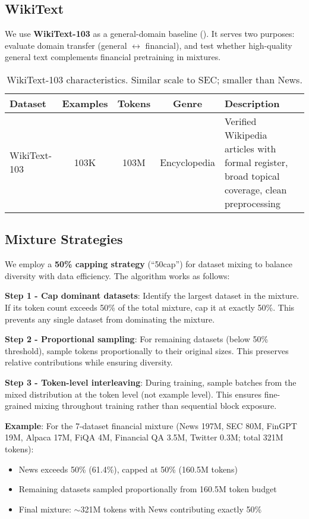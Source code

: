\subsection{WikiText}

We use \textbf{WikiText-103} \parencite{merity2016pointer} as a general-domain baseline (). It serves two purposes: evaluate domain transfer (general $\leftrightarrow$ financial), and test whether high-quality general text complements financial pretraining in mixtures.

\begin{table}[h]
\centering
\caption[WikiText Dataset Characteristics]{WikiText-103 characteristics. Similar scale to SEC; smaller than News.}
\label{tab:wikitext_dataset}
\small
\begin{tabular}{p{3cm}cccp{5.5cm}}
\toprule
\textbf{Dataset} & \textbf{Examples} & \textbf{Tokens} & \textbf{Genre} & \textbf{Description} \\
\midrule
WikiText-103 & 103K & 103M & Encyclopedia & Verified Wikipedia articles with formal register, broad topical coverage, clean preprocessing \\
\bottomrule
\end{tabular}
\end{table}

\subsection{Mixture Strategies}

We employ a \textbf{50\% capping strategy} (``50cap'') for dataset mixing to balance diversity with data efficiency. The algorithm works as follows:

\textbf{Step 1 - Cap dominant datasets}: Identify the largest dataset in the mixture. If its token count exceeds 50\% of the total mixture, cap it at exactly 50\%. This prevents any single dataset from dominating the mixture.

\textbf{Step 2 - Proportional sampling}: For remaining datasets (below 50\% threshold), sample tokens proportionally to their original sizes. This preserves relative contributions while ensuring diversity.

\textbf{Step 3 - Token-level interleaving}: During training, sample batches from the mixed distribution at the token level (not example level). This ensures fine-grained mixing throughout training rather than sequential block exposure.

\textbf{Example}: For the 7-dataset financial mixture (News 197M, SEC 80M, FinGPT 19M, Alpaca 17M, FiQA 4M, Financial QA 3.5M, Twitter 0.3M; total 321M tokens):
\begin{itemize}
\item News exceeds 50\% (61.4\%), capped at 50\% (160.5M tokens)
\item Remaining datasets sampled proportionally from 160.5M token budget
\item Final mixture: $\sim$321M tokens with News contributing exactly 50\%
\end{itemize}

